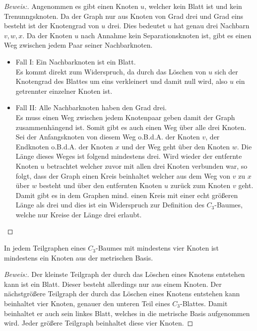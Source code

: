 \begin{proof}[Beweis:]
Angenommen es gibt einen Knoten $u$, welcher kein Blatt ist und kein Trenunngsknoten. Da der Graph nur aus Knoten von Grad drei und Grad eins besteht ist der Knotengrad von $u$ drei. Dies bedeutet $u$ hat genau drei Nachbarn $v,w,x$. Da der Knoten $u$ nach Annahme kein Separationsknoten ist, gibt es einen Weg zwischen jedem Paar seiner Nachbarknoten.
\begin{itemize}
\item Fall I: Ein Nachbarknoten ist ein Blatt.\\ Es kommt direkt zum Widerspruch, da durch das Löschen von $u$ sich der Knotengrad des Blattes um eins verkleinert und damit null wird, also $u$ ein getrennter einzelner Knoten ist.
\item Fall II: Alle Nachbarknoten haben den Grad drei.\\
Es muss einen Weg zwischen jedem Knotenpaar geben damit der Graph zusammenhängend ist. Somit gibt es auch einen Weg über alle drei Knoten. Sei der Anfangsknoten von diesem Weg o.B.d.A. der Knoten $v$, der Endknoten o.B.d.A. der Knoten $x$ und der Weg geht über den Knoten $w$. Die Länge dieses Weges ist folgend mindestens drei. Wird wieder der entfernte Knoten $u$ betrachtet welcher zuvor mit allen drei Knoten verbunden war, so folgt, dass der Graph einen Kreis beinhaltet welcher aus dem Weg von $v$ zu $x$ über $w$ besteht und über den entfernten Knoten $u$ zurück zum Knoten $v$ geht.\\
Damit gibt es in dem Graphen mind. einen Kreis mit einer echt größeren Länge als drei und dies ist ein Widerspruch zur Definition des $C_{3}$-Baumes, welche nur Kreise der Länge drei erlaubt.
\end{itemize}
\end{proof}
\begin{lem}
\label{bkb2}
In jedem Teilgraphen eines $C_{3}$-Baumes mit mindestens vier Knoten ist mindestens ein Knoten aus der metrischen Basis.
\end{lem}
\begin{proof}[Beweis:]
Der kleinste Teilgraph der durch das Löschen eines Knotens entstehen kann ist ein Blatt. Dieser besteht allerdings nur aus einem Knoten. Der nächstgrößere Teilgraph der durch das Löschen eines Knotens entstehen kann beinhaltet vier Knoten, genauer den unteren Teil eines $C_{3}$-Blattes. Damit beinhaltet er auch sein linkes Blatt, welches in die metrische Basis aufgenommen wird. Jeder größere Teilgraph beinhaltet diese vier Knoten. %
\end{proof}
